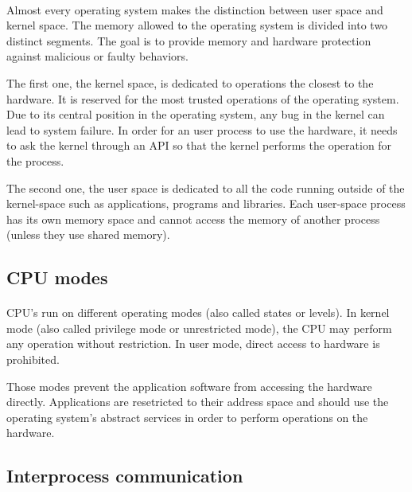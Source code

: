 \paragraph{}
Almost every operating system makes the distinction between user space and kernel space.
The memory allowed to the operating system is divided into two distinct segments.
The goal is to provide memory and hardware protection against malicious or faulty behaviors.

The first one, the kernel space, is dedicated to operations the closest to the hardware.
It is reserved for the most trusted operations of the operating system.
Due to its central position in the operating system, any bug in the kernel can lead to system failure.
In order for an user process to use the hardware, it needs to ask the kernel through an API so that the kernel performs the operation for the process.

The second one, the user space is dedicated to all the code running outside of the kernel-space such as applications, programs and libraries.
Each user-space process has its own memory space and cannot access the memory of another process (unless they use shared memory).

\subsection{CPU modes}
\paragraph{}
CPU's run on different operating modes (also called states or levels).
In kernel mode (also called privilege mode or unrestricted mode), the CPU may perform any operation without restriction.
In user mode, direct access to hardware is prohibited.

Those modes prevent the application software from accessing the hardware directly.
Applications are resetricted to their address space 
    and should use the operating system's abstract services in order to perform operations on the hardware.

\subsection{Interprocess communication}
